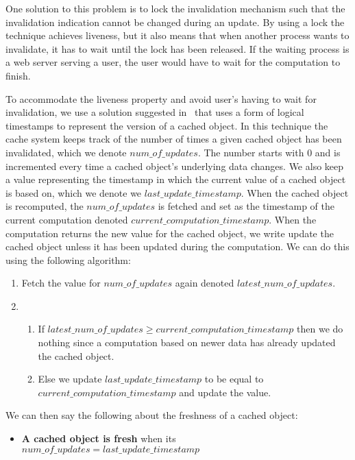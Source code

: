 One solution to this problem is to lock the invalidation mechanism such that the invalidation indication cannot be changed during an update. By using a lock the technique achieves liveness, but it also means that when another process wants to invalidate, it has to wait until the lock has been released. If the waiting process is a web server serving a user, the user would have to wait for the computation to finish.

To accommodate the liveness property and avoid user's having to wait for invalidation, we use a solution suggested in~\cite{paper:ibm-extended} that uses a form of logical timestamps to represent the version of a cached object. In this technique the cache system keeps track of the number of times a given cached object has been invalidated, which we denote $num\_of\_updates$. The number starts with $0$ and is incremented every time a cached object's underlying data changes.
We also keep a value representing the timestamp in which the current value of a cached object is based on, which we denote we $last\_update\_timestamp$. When the cached object is recomputed, the $num\_of\_updates$ is fetched and set as the timestamp of the current computation denoted $current\_computation\_timestamp$.
When the computation returns the new value for the cached object, we write update the cached object unless it has been updated during the computation. We can do this using the following algorithm:

\begin{enumerate}
  \item Fetch the value for $num\_of\_updates$ again denoted $latest\_num\_of\_updates$.
  \item
    \begin{enumerate}
      \item If $latest\_num\_of\_updates \geq current\_computation\_timestamp$ then we do nothing since a computation based on newer data has already updated the cached object.
      \item Else we update $last\_update\_timestamp$ to be equal to $current\_computation\_timestamp$ and update the value.
    \end{enumerate}
\end{enumerate}

We can then say the following about the freshness of a cached object:

\begin{itemize}
  \item \textbf{A cached object is fresh} when its $num\_of\_updates = last\_update\_timestamp$
\end{itemize}


